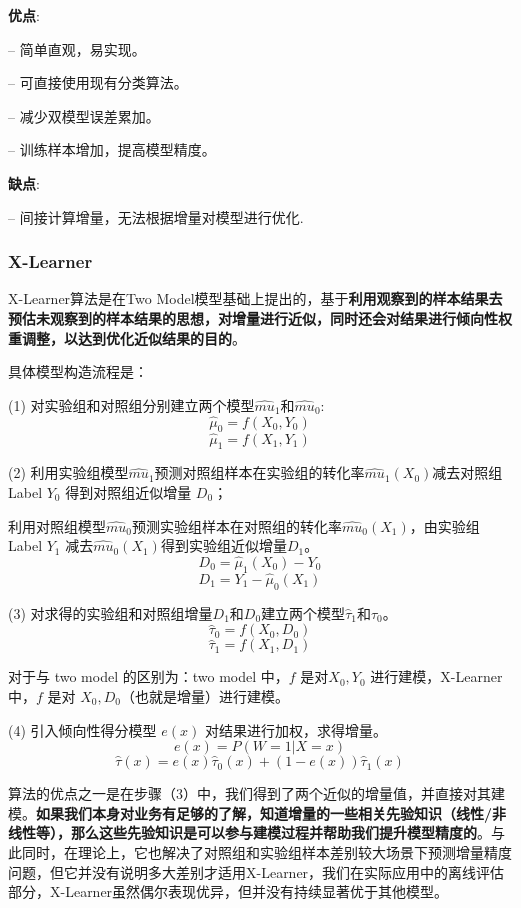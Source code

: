\documentclass[12pt]{article}
\begin{document}
\textbf{优点}:

– 简单直观，易实现。

– 可直接使用现有分类算法。

– 减少双模型误差累加。

– 训练样本增加，提高模型精度。

\textbf{缺点}:

– 间接计算增量，无法根据增量对模型进行优化.

\subsubsection{X-Learner}
X-Learner算法是在Two Model模型基础上提出的，基于\textbf{利用观察到的样本结果去预估未观察到的样本结果的思想，对增量进行近似，同时还会对结果进行倾向性权重调整，以达到优化近似结果的目的}。

具体模型构造流程是：

(1) 对实验组和对照组分别建立两个模型$\hat{mu}_1$和$\hat{mu}_0$:
$$
\hat{\mu}_0 = f(X_0, Y_0)
$$
$$
\hat{\mu}_1 = f(X_1, Y_1)
$$

(2) 利用实验组模型$\hat{mu}_1$预测对照组样本在实验组的转化率$\hat{mu}_1(X_0)$减去对照组Label $Y_0$ 得到对照组近似增量 $D_0$；

利用对照组模型$\hat{mu}_0$预测实验组样本在对照组的转化率$\hat{mu}_0(X_1)$，由实验组 Label $Y_1$ 减去$\hat{mu}_0(X_1)$得到实验组近似增量$D_1$。
$$
D_0 = \hat{\mu}_1(X_0) - Y_0
$$
$$
D_1 = Y_1 -  \hat{\mu}_0(X_1)
$$

(3) 对求得的实验组和对照组增量$D_1$和$D_0$建立两个模型$\hat{\tau}_1$和$\hat{\tau}_0$。
$$
\hat{\tau}_0 = f(X_0, D_0)
$$
$$
\hat{\tau}_1 = f(X_1, D_1)
$$

\begin{framed}
对于与  two model 的区别为：two model 中，$f$ 是对$X_0, Y_0$ 进行建模，X-Learner 中，$f$ 是对 $X_0, D_0$（也就是增量）进行建模。
\end{framed}

(4) 引入倾向性得分模型 $e(x)$ 对结果进行加权，求得增量。
$$
e(x) = P(W=1|X=x)
$$
$$
\hat{\tau}(x) = e(x) \hat{\tau}_0(x) + (1- e(x)) \hat{\tau}_1(x)
$$

算法的优点之一是在步骤（3）中，我们得到了两个近似的增量值，并直接对其建模。\textbf{如果我们本身对业务有足够的了解，知道增量的一些相关先验知识（线性/非线性等），那么这些先验知识是可以参与建模过程并帮助我们提升模型精度的}。与此同时，在理论上，它也解决了对照组和实验组样本差别较大场景下预测增量精度问题，但它并没有说明多大差别才适用X-Learner，我们在实际应用中的离线评估部分，X-Learner虽然偶尔表现优异，但并没有持续显著优于其他模型。
\end{document}
